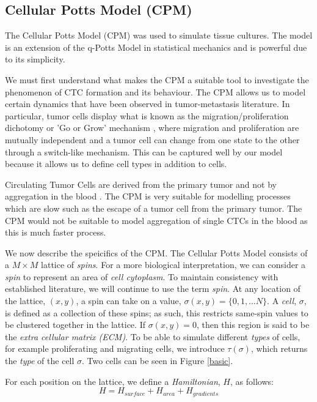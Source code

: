 \documentclass[12pt]{article}
\begin{document}
\subsection{Cellular Potts Model (CPM)}
The Cellular Potts Model (CPM) \cite{Graner1992} was used to simulate tissue cultures. The model is an extension of the q-Potts Model in statistical mechanics and is powerful due to its simplicity. 

We must first understand what makes the CPM a suitable tool to investigate the phenomenon of CTC formation and its behaviour. The CPM allows us to model certain dynamics that have been observed in tumor-metastasis literature. In particular, tumor cells display what is known as the migration/proliferation dichotomy or 'Go or Grow' mechanism \cite{Godlewski2010}\cite{Hatzikirou2012}, where migration and proliferation are mutually independent and a tumor cell can change from one state to the other through a switch-like mechanism. This can be captured well by our model because it allows us to define cell types in addition to cells.

Circulating Tumor Cells are derived from the primary tumor and not by aggregation in the blood \cite{Aceto2014}. The CPM is very suitable for modelling processes which are slow such as the escape of a tumor cell from the primary tumor. The CPM would not be suitable to model aggregation of single CTCs in the blood as this is much faster process. 

We now describe the speicifics of the CPM. The Cellular Potts Model consists of a $M\times M$ lattice of \emph{spins}. For a more biological interpretation, we can consider a \emph{spin} to represent an area of \emph{cell cytoplasm}. To maintain consistency with established literature, we will continue to use the term \emph{spin}. At any location of the lattice, $(x,y)$, a spin can take on a value, $\sigma(x,y) = \{0,1,\ldots N\}$. A \emph{cell}, $\sigma$, is defined as a collection of these spins; as such, this restricts same-spin values to be clustered together in the lattice. If $\sigma(x,y) = 0$, then this region is said to be the \emph{extra cellular matrix (ECM)}. To be able to simulate different \emph{types} of cells, for example proliferating and migrating cells, we introduce $\tau(\sigma)$, which returns the \emph{type} of the cell $\sigma$. Two cells can be seen in Figure \ref{basic}.

For each position on the lattice, we define a \emph{Hamiltonian}, $H$, as follows:
\begin{equation}
	H = H_{surface} + H_{area} + H_{gradients}
	\label{hamiltonian}
\end{equation}
\end{document}

